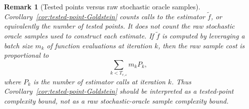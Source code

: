 \documentclass[11pt,a4paper]{article}
\newtheorem{remark}{Remark}[section]
\newcommand{\goldelta}{r}
\begin{document}
\begin{remark}[Tested points versus raw stochastic oracle samples]
Corollary~\ref{cor:tested-point-Goldstein} counts calls to the estimator
\(\tilde f\), or equivalently the number of tested points. It does not count the
raw stochastic oracle samples used to construct each estimate. If \(\tilde f\) is computed by leveraging a batch size \(m_k\) of function evaluations at
iteration \(k\), then the raw sample cost is proportional to
\[
    \sum_{k<T_{\goldelta,\varepsilon}} m_k P_k,
\]
where \(P_k\) is the number of estimator calls at iteration \(k\). Thus Corollary~\ref{cor:tested-point-Goldstein} should be interpreted as a
tested-point complexity bound, not as a raw stochastic-oracle sample complexity
bound.
\end{remark}

\end{document}
